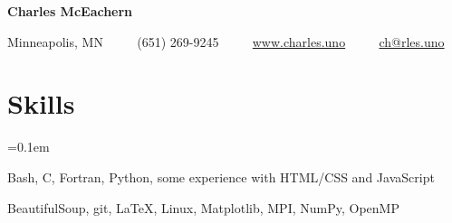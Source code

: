 \documentclass[11pt,letterpaper]{article}
\newcommand{\ResumeSection}[1]{
  \section*{ {\color{MidnightBlue}#1 \sout{\hfill} } } }
\newcommand{\URL}[1]{\href{#1}{#1}\xspace}
\newcommand{\CPP}{
  C\nolinebreak[4]\hspace{-.05em}\raisebox{.22ex}{\footnotesize\bf ++}\xspace}
\begin{document}


\begin{center}
  { \Huge \textbf{Charles McEachern} }

  \vspace{7pt}

  Minneapolis, MN
  \ \ \textbullet
  \ \ (651) 269-9245
  \ \ \textbullet
  \ \ \URL{www.charles.uno}
  \ \ \textbullet
  \ \ \href{mailto:ch@rles.uno}{ch@rles.uno}

  \vspace{3pt}

\end{center}


\ResumeSection{Skills}

\begin{description}[leftmargin=!, labelindent=\parindent, 
                    labelwidth=\widthof{\bfseries Languages}]
  \parskip=0.1em

  \item[Languages]
    Bash, \CPP, Fortran, Python, some experience with HTML/CSS and JavaScript

  \item[Tools]
    BeautifulSoup, git, \LaTeX, Linux, Matplotlib, MPI, NumPy, OpenMP

\end{description}

\end{document}
